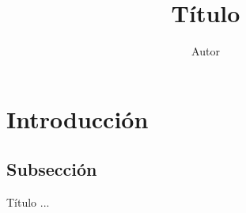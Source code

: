 \documentclass[11pt]{beamer}
\author{Autor\\}
\title{Título}
\institute{Servicio Geológico Colombiano}
\date{}
\begin{document}
\begin{frame}
\titlepage
\end{frame}

\begin{frame}
\tableofcontents
\end{frame}

\section{Introducción}
\subsection{Subsección}
\begin{frame}{Título}
...
\end{frame}
\end{document}
